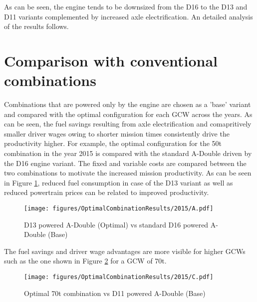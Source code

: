\documentclass[ExampleMasters.tex]{subfiles}
\begin{document}
As can be seen, the engine tends to be downsized from the D16 to the D13 and D11 variants complemented by increased axle electrification. An detailed analysis of the results follows.\\

\section{Comparison with conventional combinations}
Combinations that are powered only by the engine are chosen as a 'base' variant and compared with the optimal configuration for each GCW across the years. As can be seen, the fuel savings resulting from axle electrification and comapritively smaller driver wages owing to shorter mission times consistently drive the productivity higher. For example, the optimal configuration for the 50t combination in the year 2015 is compared with the standard A-Double driven by the D16 engine variant. The fixed and variable costs are compared between the two combinations to motivate the increased mission productivity. As can be seen in Figure \ref{2015A0vsA1}, reduced fuel consumption in case of the D13 variant as well as reduced powertrain prices can be related to improved productivity.\\

\begin{figure}
\centering
\texttt{[image: figures/OptimalCombinationResults/2015/A.pdf]}
\caption{D13 powered A-Double (Optimal) vs standard D16 powered A-Double (Base)}
\label{2015A0vsA1}
\end{figure}

The fuel savings and driver wage advantages are more visible for higher GCWs such as the one shown in Figure \ref{2015C0vsC1} for a GCW of 70t.\\

\begin{figure}
\centering
\texttt{[image: figures/OptimalCombinationResults/2015/C.pdf]}
\caption{Optimal 70t combination vs D11 powered A-Double (Base)}
\label{2015C0vsC1}
\end{figure}
\end{document}
